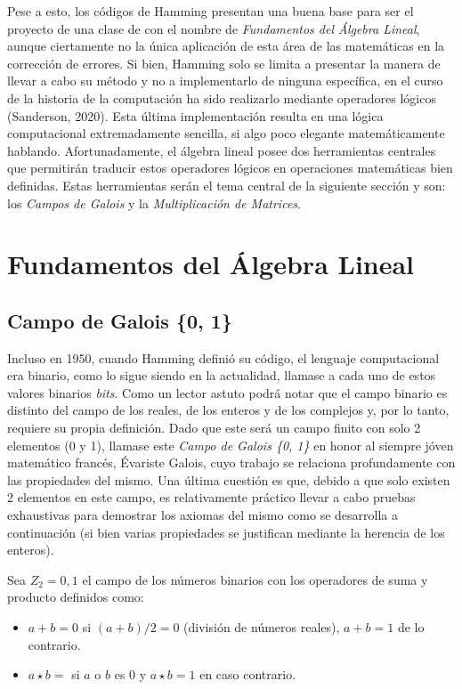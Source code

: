 \documentclass{article}
\begin{document}
Pese a esto, los códigos de Hamming presentan una buena base para ser el proyecto de una clase de con el nombre de \textit{Fundamentos del Álgebra Lineal}, aunque ciertamente no la única aplicación de esta área de las matemáticas en la corrección de errores. Si bien, Hamming solo se limita a presentar la manera de llevar a cabo su método y no a implementarlo de ninguna específica, en el curso de la historia de la computación ha sido realizarlo mediante operadores lógicos (Sanderson, 2020). Esta última implementación resulta en una lógica computacional extremadamente sencilla, si algo poco elegante matemáticamente hablando. Afortunadamente, el álgebra lineal posee dos herramientas centrales que permitirán traducir estos operadores lógicos en operaciones matemáticas bien definidas. Estas herramientas serán el tema central de la siguiente sección y son: los \textit{Campos de Galois} y la \textit{Multiplicación de Matrices}.

\section{Fundamentos del Álgebra Lineal}

\subsection{Campo de Galois \{0, 1\}}

Incluso en 1950, cuando Hamming definió su código, el lenguaje computacional era binario, como lo sigue siendo en la actualidad, llamase a cada uno de estos valores binarios \textit{bits}. Como un lector astuto podrá notar que el campo binario es distinto del campo de los reales, de los enteros y de los complejos y, por lo tanto, requiere su propia definición. Dado que este será un campo finito con solo 2 elementos (0 y 1), llamase este \textit{Campo de Galois \{0, 1\}} en honor al siempre jóven matemático francés, Évariste Galois, cuyo trabajo se relaciona profundamente con las propiedades del mismo. Una última cuestión es que, debido a que solo existen 2 elementos en este campo, es relativamente práctico llevar a cabo pruebas exhaustivas para demostrar los axiomas del mismo como se desarrolla a continuación (si bien varias propiedades se justifican mediante la herencia de los enteros).

Sea $Z_2 = {0, 1}$ el campo de los números binarios con los operadores de suma y producto definidos como:
\begin{itemize}
    \item $a + b = 0$ si $(a + b)/2 = 0$ (división de números reales), $a + b = 1$ de lo contrario.
    \item $a \star b = $ si $a$ o $b$ es $0$ y $a \star b = 1$ en caso contrario.
\end{itemize}
\end{document}
